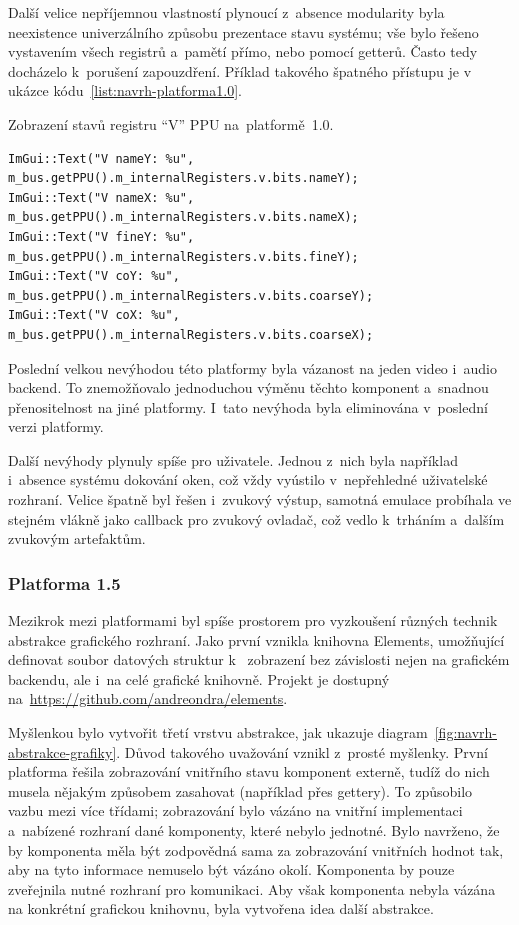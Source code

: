 Další velice nepříjemnou vlastností plynoucí z~absence modularity byla neexistence univerzálního způsobu prezentace stavu systému; vše bylo řešeno vystavením všech registrů a~pamětí přímo, nebo pomocí getterů. Často tedy docházelo k~porušení zapouzdření. Příklad takového špatného přístupu je v ukázce kódu~\ref{list:navrh-platforma1.0}.

\begin{listing}
	\caption{Zobrazení stavů registru \enquote{V} PPU na~platformě~1.0.}
	\label{list:navrh-platforma1.0}
	\begin{verbatim}
ImGui::Text("V nameY: %u", m_bus.getPPU().m_internalRegisters.v.bits.nameY);
ImGui::Text("V nameX: %u", m_bus.getPPU().m_internalRegisters.v.bits.nameX);
ImGui::Text("V fineY: %u", m_bus.getPPU().m_internalRegisters.v.bits.fineY);
ImGui::Text("V coY: %u",   m_bus.getPPU().m_internalRegisters.v.bits.coarseY);
ImGui::Text("V coX: %u",   m_bus.getPPU().m_internalRegisters.v.bits.coarseX);
	\end{verbatim}
\end{listing}

Poslední velkou nevýhodou této platformy byla vázanost na jeden video i~audio backend. To znemožňovalo jednoduchou výměnu těchto komponent a~snadnou přenositelnost na jiné platformy. I~tato nevýhoda byla eliminována v~poslední verzi platformy.

Další nevýhody plynuly spíše pro uživatele. Jednou z~nich byla například i~absence systému dokování oken, což vždy vyústilo v~nepřehledné uživatelské rozhraní. Velice špatně byl řešen i~zvukový výstup, samotná emulace probíhala ve stejném vlákně jako callback pro zvukový ovladač, což vedlo k~trháním a~dalším zvukovým artefaktům.

\subsubsection{Platforma 1.5}
\label{sec:navrh-platforma1.5}
Mezikrok mezi platformami byl spíše prostorem pro vyzkoušení různých technik abstrakce grafického rozhraní. Jako první vznikla knihovna Elements, umožňující definovat soubor datových struktur k~ zobrazení bez závislosti nejen na grafickém backendu, ale i~na celé grafické knihovně. Projekt je dostupný na~\url{https://github.com/andreondra/elements}.

Myšlenkou bylo vytvořit třetí vrstvu abstrakce, jak ukazuje diagram~\ref{fig:navrh-abstrakce-grafiky}. Důvod takového uvažování vznikl z~prosté myšlenky. První platforma řešila zobrazování vnitřního stavu komponent externě, tudíž do nich musela nějakým způsobem zasahovat (například přes gettery). To způsobilo vazbu mezi více třídami; zobrazování bylo vázáno na vnitřní implementaci a~nabízené rozhraní dané komponenty, které nebylo jednotné. Bylo navrženo, že by komponenta měla být zodpovědná sama za zobrazování vnitřních hodnot tak, aby na tyto informace nemuselo být vázáno okolí. Komponenta by pouze zveřejnila nutné rozhraní pro komunikaci. Aby však komponenta nebyla vázána na konkrétní grafickou knihovnu, byla vytvořena idea další abstrakce.

